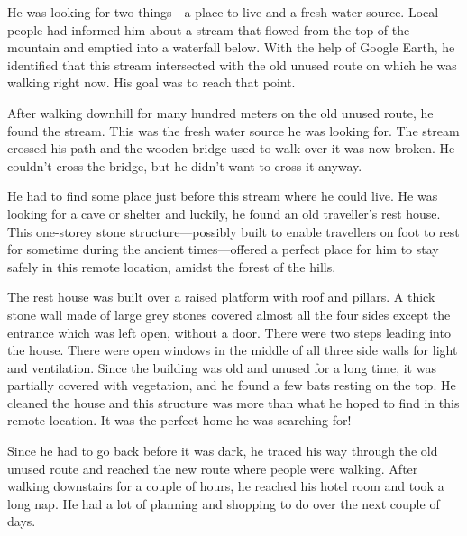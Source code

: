 He was looking for two things—a place to live and a fresh water source. Local
people had informed him about a stream that flowed from the top of the mountain
and emptied into a waterfall below. With the help of Google Earth, he identified
that this stream intersected with the old unused route on which he was walking
right now. His goal was to reach that point.

After walking downhill for many hundred meters on the old unused route, he found
the stream. This was the fresh water source he was looking for. The stream
crossed his path and the wooden bridge used to walk over it was now broken. He
couldn't cross the bridge, but he didn't want to cross it anyway.

He had to find some place just before this stream where he could live. He was
looking for a cave or shelter and luckily, he found an old traveller's rest
house. This one-storey stone structure—possibly built to enable travellers on
foot to rest for sometime during the ancient times—offered a perfect place for
him to stay safely in this remote location, amidst the forest of the hills.

The rest house was built over a raised platform with roof and pillars. A thick
stone wall made of large grey stones covered almost all the four sides except
the entrance which was left open, without a door. There were two steps leading
into the house. There were open windows in the middle of all three side walls
for light and ventilation. Since the building was old and unused for a long
time, it was partially covered with vegetation, and he found a few bats resting
on the top. He cleaned the house and this structure was more than what he hoped
to find in this remote location. It was the perfect home he was searching for!

Since he had to go back before it was dark, he traced his way through the old
unused route and reached the new route where people were walking. After walking
downstairs for a couple of hours, he reached his hotel room and took a long nap.
He had a lot of planning and shopping to do over the next couple of days.